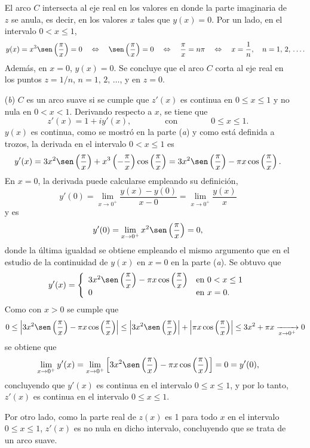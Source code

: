 \documentclass[a4paper]{report}
\begin{document}
\begin{enumerate}
El arco \(C\) intersecta al eje real en los valores en donde la parte imaginaria de \(z\) se anula, es decir, en los valores \(x\) tales que \(y(x)=0\). Por un lado, en el intervalo \(0<x\leq1\),
\[
 y(x)=x^3\sen\left(\frac{\pi}{x}\right)=0
 \quad\Leftrightarrow\quad 
 \sen\left(\frac{\pi}{x}\right)=0
 \quad\Leftrightarrow\quad 
 \frac{\pi}{x}=n\pi
 \quad\Leftrightarrow\quad
 x=\frac{1}{n},
 \quad
 n=1,\,2,\,\dots.
\]
Además, en \(x=0\), \(y(x)=0\). Se concluye que el arco \(C\) corta al eje real en los puntos \(z=1/n\), \(n=1,\,2,\,\dots\), y en \(z=0\).
\item[(\textit{b})] \(C\) es un arco suave si se cumple que \(z'(x)\) es continua en \(0\leq x\leq1\) y no nula en \(0<x<1\). Derivando respecto a \(x\), se tiene que
\[
 z'(x)=1+iy'(x),
 \qquad\qquad\textrm{con}\qquad\qquad
 0\leq x\leq1.
\]
\(y(x)\) es continua, como se mostró en la parte (\textit{a}) y como está definida a trozos, la derivada en el intervalo \(0<x\leq1\) es 
\[
 y'(x)=3x^2\sen\left(\frac{\pi}{x}\right)+x^3\left(-\frac{\pi}{x}\right)\cos\left(\frac{\pi}{x}\right)=3x^2\sen\left(\frac{\pi}{x}\right)-\pi x\cos\left(\frac{\pi}{x}\right).
\]
En \(x=0\), la derivada puede calcularse empleando su definición,
\[
 y'(0)=\lim_{x\to0^+}\frac{y(x)-y(0)}{x-0}=\lim_{x\to0^+}\frac{y(x)}{x}
\]
y es
\[
 y'(0)=\lim_{x\to0^+}x^2\sen\left(\frac{\pi}{x}\right)=0,
\]
donde la última igualdad se obtiene empleando el mismo argumento que en el estudio de la continuidad de \(y(x)\) en \(x=0\) en la parte (\textit{a}). Se obtuvo que 
\[
 y'(x)=\left\{ 
 \begin{array}{ll}
  3x^2\sen\left(\dfrac{\pi}{x}\right)-\pi x\cos\left(\dfrac{\pi}{x}\right)&\textrm{en }0<x\leq1\\
  0&\textrm{en }x=0.
 \end{array}
 \right.
\]
Como con \(x>0\) se cumple que 
\[
 0\leq\left|3x^2\sen\left(\dfrac{\pi}{x}\right)-\pi x\cos\left(\dfrac{\pi}{x}\right)\right|
 \leq\left|3x^2\sen\left(\dfrac{\pi}{x}\right)\right|+\left|\pi x\cos\left(\dfrac{\pi}{x}\right)\right|\leq3x^2+\pi x\xrightarrow[x\to0^+]{} 0
\]
se obtiene que 
\[
 \lim_{x\to0^+}y'(x)=\lim_{x\to0^+}\left[3x^2\sen\left(\dfrac{\pi}{x}\right)-\pi x\cos\left(\dfrac{\pi}{x}\right)\right]=0=y'(0),
\]
concluyendo que \(y'(x)\) es continua en el intervalo \(0\leq x\leq1\), y por lo tanto, \(z'(x)\) es continua en el intervalo \(0\leq x\leq1\).

Por otro lado, como la parte real de \(z(x)\) es 1 para todo \(x\) en el intervalo \(0\leq x\leq1\), \(z'(x)\) es no nula en dicho intervalo, concluyendo que se trata de un arco suave.
\end{enumerate}
\end{document}
